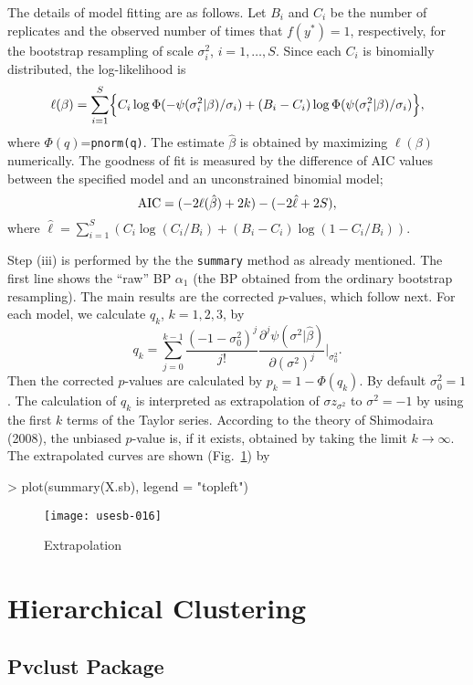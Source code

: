 \documentclass[a4paper]{amsart}
\begin{document}
The details of model fitting are as follows. Let $B_i$ and $C_i$ be
the number of replicates and the observed number of times that
$f(y^*)=1$, respectively, for the bootstrap resampling of scale
$\sigma^2_i$, $i=1,\ldots,S$. Since each $C_i$ is binomially
distributed, the log-likelihood is
\[
\ell(\beta) = \sum_{i=1}^S \Bigl\{
C_i \log \Phi(-\psi(\sigma^2_i|\beta)/\sigma_i)+
(B_i - C_i) \log \Phi(\psi(\sigma^2_i|\beta)/\sigma_i)
\Bigr\},
\]
where $\Phi(q)$={\tt pnorm(q)}. The estimate $\hat\beta$ is obtained
by maximizing $\ell(\beta)$ numerically.  The goodness of fit is
measured by the difference of AIC values between the specified model
and an unconstrained binomial model;
\[
{\rm AIC} = ( -2\ell(\hat\beta)+2k ) - (-2\hat\ell + 2S),
\]
where $\hat\ell = \sum_{i=1}^S ( C_i\log(C_i/B_i) +
(B_i-C_i)\log(1-C_i/B_i)) $.


Step (iii) is performed by the the {\tt summary} method as already
mentioned. The first line shows the ``raw'' BP $\alpha_1$ (the BP
obtained from the ordinary bootstrap resampling).  The main results
are the corrected $p$-values, which follow next. For each model, we
calculate $q_k$, $k=1,2,3$, by
\[
q_k = \sum_{j=0}^{k-1} \frac{(-1-\sigma_0^2)^j}{j!}
\frac{\partial^j \psi(\sigma^2|\hat\beta)}{\partial (\sigma^2)^j}
\Bigr|_{\sigma_0^2}.
\]
Then the corrected $p$-values are calculated by $p_k=1-\Phi(q_k)$.  By
default $\sigma_0^2=1$. The calculation of $q_k$ is interpreted as
extrapolation of $\sigma z_{\sigma^2}$ to $\sigma^2=-1$ by using the
first $k$ terms of the Taylor series. According to the theory of
Shimodaira (2008), the unbiased $p$-value is, if it exists, obtained
by taking the limit $k\to\infty$. The extrapolated curves are shown
(Fig.~\ref{fig:diag1s}) by
\begin{Schunk}
\begin{Sinput}
> plot(summary(X.sb), legend = "topleft")
\end{Sinput}
\end{Schunk}
\begin{figure}
\begin{center}
\texttt{[image: usesb-016]}
\caption{Extrapolation}\label{fig:diag1s}
\end{center}
\end{figure}


\section{Hierarchical Clustering}

\subsection{Pvclust Package}
\end{document}
